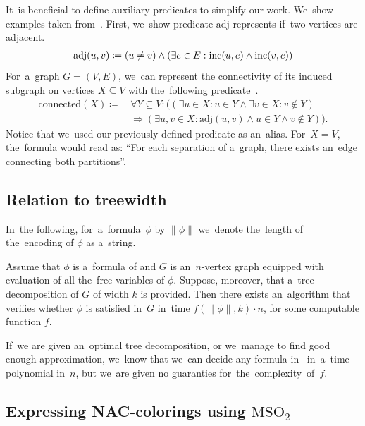 It~is beneficial to define auxiliary predicates to simplify our work.
We~show examples taken from~\cite{book_parametrized_algorithms}.
First, we~show predicate \( \text{adj} \) represents if~two vertices are adjacent.
%
\begin{align*}
	\text{adj}(u, v) \coloneqq (u \ne v) \land (\exists e \in E : \text{inc} (u, e) \land \text{inc} (v, e))
\end{align*}
%
For~a~graph \( G = (V, E) \), we~can represent the connectivity of its induced subgraph
on vertices \( X \subseteq V \) with the~following predicate~\cite{book_parametrized_algorithms}.
%
\begin{align*}
	\text{connected}(X) \coloneqq \, &
	\forall Y \subseteq V : \Big(
	(
	\exists u \in X : u \in Y \land
	\exists v \in X : v \not\in Y
	)
	\\ &
	\Rightarrow
	(
	\exists u, v \in X : \text{adj}(u, v) \land u \in Y \land v \not\in Y
	)\Big).
\end{align*}
%
Notice that we~used our previously defined predicate as an~alias.
For~\( X = V \), the~formula would read as:
``For each separation of a~graph, there exists an~edge connecting both partitions''.

\subsection{Relation to treewidth}

In~the following, for~a~formula~\( \phi \) by \( \|\phi\| \)
we~denote the~length of the~encoding of \( \phi \) as a~string.
%
\begin{theorem}%
	\label{theorem:courcelles_theorem}%
	Assume that \( \phi \) is a~formula of \MSO{} and
	\( G \) is an~\( n \)-vertex graph equipped
	with evaluation of all the~free variables of \( \phi \).
	Suppose, moreover, that a~tree decomposition of \( G \) of width \( k \) is provided.
	Then there exists an~algorithm that verifies whether \( \phi \)
	is satisfied in~\( G \) in~time \( f (\|\phi\|, k) \cdot n \),
	for some computable function \( f \).
\end{theorem}
%
If~we are given an~optimal tree decomposition, or we~manage to find good enough
approximation, we~know that we~can decide any formula in~\MSO{} in~a~time
polynomial in~\( n \), but we~are given no guaranties for~the~complexity~of~\( f \).

\subsection{Expressing NAC-colorings using \( \text{MSO}_2 \)}

